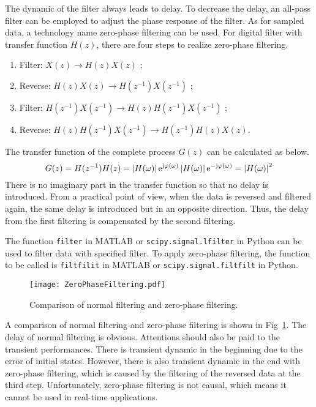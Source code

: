 The dynamic of the filter always leads to delay. To decrease the delay, an all-pass filter can be employed to adjust the phase response of the filter. As for sampled data, a technology name zero-phase filtering can be used. For digital filter with transfer function $H(z)$, there are four steps to realize zero-phase filtering.
\begin{enumerate}
    \setlength{\itemsep}{0pt}
    \item Filter: $X(z) \rightarrow H(z)X(z)$ ;
    \item Reverse: $H(z)X(z) \rightarrow H(z^{-1})X(z^{-1})$ ;
    \item Filter: $H(z^{-1})X(z^{-1}) \rightarrow H(z)H(z^{-1})X(z^{-1})$ ;
    \item Reverse: $H(z)H(z^{-1})X(z^{-1}) \rightarrow H(z^{-1})H(z)X(z)$.
\end{enumerate}
The transfer function of the complete process $G(z)$ can be calculated as below.
\begin{equation}
    G(z) = H(z^{-1})H(z) = \left| H(\omega) \right| \mathrm{e}^{\mathrm{j} \varphi (\omega)} \left| H(\omega) \right| \mathrm{e}^{-\mathrm{j} \varphi (\omega)}  = \left| H(\omega) \right|^2
\end{equation}
There is no imaginary part in the transfer function so that no delay is introduced. From a practical point of view, when the data is reversed and filtered again, the same delay is introduced but in an opposite direction. Thus, the delay from the first filtering is compensated by the second filtering.


The function \verb|filter| in MATLAB or \verb|scipy.signal.lfilter| in Python can be used to filter data with specified filter. To apply zero-phase filtering, the function to be called is \verb|filtfilit| in MATLAB or \verb|scipy.signal.filtfilt| in Python. 


\begin{figure}[!htb]
    \centering
    \texttt{[image: ZeroPhaseFiltering.pdf]}
    \caption{Comparison of normal filtering and zero-phase filtering.}
    \label{fig:zerofiltering}
\end{figure}


A comparison of normal filtering and zero-phase filtering is shown in Fig~\ref{fig:zerofiltering}. The delay of normal filtering is obvious. Attentions should also be paid to the transient performances. There is transient dynamic in the beginning due to the error of initial states. However, there is also transient dynamic in the end with zero-phase filtering, which is caused by the filtering of the reversed data at the third step. Unfortunately, zero-phase filtering is not causal, which means it cannot be used in real-time applications.





